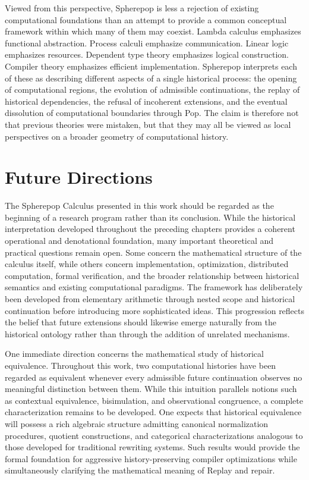 \documentclass[12pt,oneside]{article}
\theoremstyle{definition}
\theoremstyle{remark}
\begin{document}
Viewed from this perspective, Spherepop is less a rejection of existing
computational foundations than an attempt to provide a common conceptual
framework within which many of them may coexist. Lambda calculus emphasizes
functional abstraction. Process calculi emphasize communication. Linear logic
emphasizes resources. Dependent type theory emphasizes logical construction.
Compiler theory emphasizes efficient implementation. Spherepop interprets each
of these as describing different aspects of a single historical process: the
opening of computational regions, the evolution of admissible continuations,
the replay of historical dependencies, the refusal of incoherent extensions,
and the eventual dissolution of computational boundaries through Pop. The
claim is therefore not that previous theories were mistaken, but that they may
all be viewed as local perspectives on a broader geometry of computational
history.

\section{Future Directions}

The Spherepop Calculus presented in this work should be regarded as the
beginning of a research program rather than its conclusion. While the
historical interpretation developed throughout the preceding chapters provides
a coherent operational and denotational foundation, many important theoretical
and practical questions remain open. Some concern the mathematical structure
of the calculus itself, while others concern implementation, optimization,
distributed computation, formal verification, and the broader relationship
between historical semantics and existing computational paradigms. The
framework has deliberately been developed from elementary arithmetic through
nested scope and historical continuation before introducing more sophisticated
ideas. This progression reflects the belief that future extensions should
likewise emerge naturally from the historical ontology rather than through the
addition of unrelated mechanisms.

One immediate direction concerns the mathematical study of historical
equivalence. Throughout this work, two computational histories have been
regarded as equivalent whenever every admissible future continuation observes
no meaningful distinction between them. While this intuition parallels notions
such as contextual equivalence, bisimulation, and observational congruence, a
complete characterization remains to be developed. One expects that historical
equivalence will possess a rich algebraic structure admitting canonical
normalization procedures, quotient constructions, and categorical
characterizations analogous to those developed for traditional rewriting
systems. Such results would provide the formal foundation for aggressive
history-preserving compiler optimizations while simultaneously clarifying the
mathematical meaning of Replay and repair.
\end{document}
